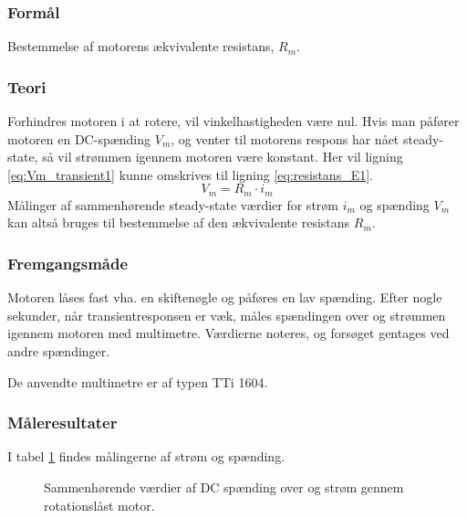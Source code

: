 \subsubsection{Formål}
Bestemmelse af motorens ækvivalente resistans, \(R_m\).
\subsubsection{Teori}
Forhindres motoren i at rotere, vil vinkelhastigheden være nul.
Hvis man påfører motoren en DC-spænding \(V_m\),
og venter til motorens respons har nået steady-state,
så vil strømmen igennem motoren være konstant.
Her vil ligning \ref{eq:Vm_transient1} kunne omskrives til ligning \ref{eq:resistans_E1}.
\begin{equation}
	V_m=R_m \cdot i_m
	\label{eq:resistans_E1} 
 \end{equation}
Målinger af sammenhørende steady-state værdier for strøm \(i_m\) og spænding \(V_m\)
kan altså bruges til bestemmelse af den ækvivalente resistans \(R_m\).
\subsubsection{Fremgangsmåde}
Motoren låses fast vha. en skiftenøgle og påføres en lav spænding.
Efter nogle sekunder, når transientresponsen er væk,
måles spændingen over og strømmen igennem motoren med multimetre.
Værdierne noteres, og forsøget gentages ved andre spændinger.

De anvendte multimetre er af typen TTi 1604.
\subsubsection{Måleresultater}
I tabel \ref{tb:resistans} findes målingerne af strøm og spænding.
\begin{figure}[th!]
	\centering
	
	\captionsetup{type=table}
	\caption[Sammenhørende værdier af DC spænding og strøm]
			{Sammenhørende værdier af DC spænding over og strøm gennem rotationslåst motor.}
	\label{tb:resistans}
\end{figure}
